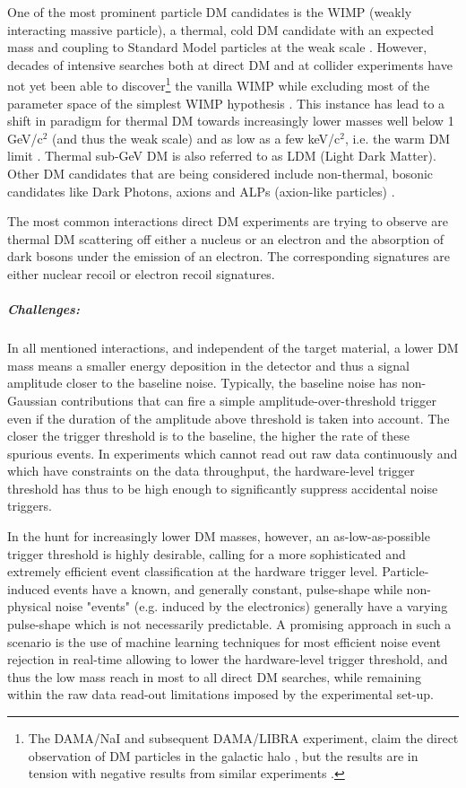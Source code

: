 One of the most prominent particle DM candidates is the WIMP (weakly interacting massive particle), a thermal, cold DM candidate with an expected mass and coupling to Standard Model particles at the weak scale \cite{Jungman_1996}. However, decades of intensive searches both at direct DM and at collider experiments have not yet been able to discover\footnote{The DAMA/NaI and subsequent DAMA/LIBRA experiment, claim the direct observation of DM particles in the galactic halo \cite{Bernabei_2013}, but the results are in tension with negative results from similar experiments \cite{Schumann_2019}.} the vanilla WIMP while excluding most of the parameter space of the simplest WIMP hypothesis \cite{Schumann_2019}. This instance has lead to a shift in paradigm for thermal DM towards increasingly lower masses well below 1\,GeV/c$^2$ (and thus the weak scale) \cite{B_hm_2004} and as low as a few keV/c$^2$, i.e. the warm DM limit \cite{Weinberg_2015}. Thermal sub-GeV DM is also referred to as LDM (Light Dark Matter). Other DM candidates that are being considered include non-thermal, bosonic candidates like Dark Photons, axions and ALPs (axion-like particles) \cite{Peccei:2006as, Svrcek:2006yi, Holdom:1985ag}.

The most common interactions direct DM experiments are trying to observe are thermal DM scattering off either a nucleus or an electron and the absorption of dark bosons under the emission of an electron. The corresponding signatures are either nuclear recoil or electron recoil signatures.


\subparagraph*{Challenges:} In all mentioned interactions, and independent of the target material, a lower DM mass means a smaller energy deposition in the detector and thus a signal amplitude closer to the baseline noise. Typically, the baseline noise has non-Gaussian contributions that can fire a simple amplitude-over-threshold trigger even if the duration of the amplitude above threshold is taken into account. The closer the trigger threshold is to the baseline, the higher the rate of these spurious events. In experiments which cannot read out raw data continuously and which have constraints on the data throughput, the hardware-level trigger threshold has thus to be high enough to significantly suppress accidental noise triggers.

In the hunt for increasingly lower DM masses, however, an as-low-as-possible trigger threshold is highly desirable, calling for a more sophisticated and extremely efficient event classification at the hardware trigger level. Particle-induced events have a known, and generally constant, pulse-shape while non-physical noise "events" (e.g. induced by the electronics) generally have a varying pulse-shape which is not necessarily predictable. A promising approach in such a scenario is the use of machine learning techniques for most efficient noise event rejection in real-time allowing to lower the hardware-level trigger threshold, and thus the low mass reach in most to all direct DM searches, while remaining within the raw data read-out limitations imposed by the experimental set-up.



